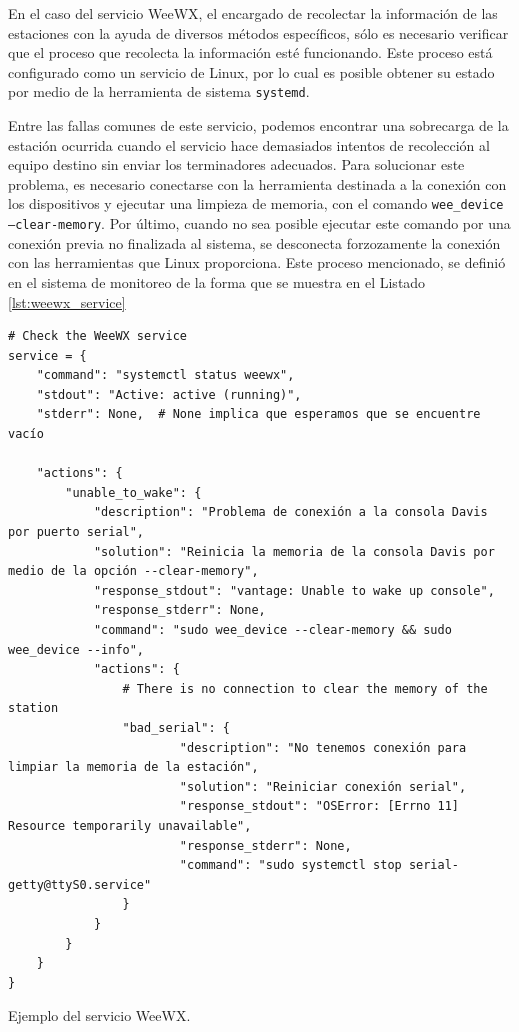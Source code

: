En el caso del servicio WeeWX, el encargado de recolectar la información de las estaciones con la ayuda de diversos métodos específicos, sólo es necesario verificar que el proceso que recolecta la información esté funcionando. Este proceso está configurado como un servicio de Linux, por lo cual es posible obtener su estado por medio de la herramienta de sistema \texttt{systemd}.

Entre las fallas comunes de este servicio, podemos encontrar una sobrecarga de la estación ocurrida cuando el servicio hace demasiados intentos de recolección al equipo destino sin enviar los terminadores adecuados. Para solucionar este problema, es necesario conectarse con la herramienta destinada a la conexión con los dispositivos y ejecutar una limpieza de memoria, con el comando \texttt{wee\_device --clear-memory}. Por último, cuando no sea posible ejecutar este comando por una conexión previa no finalizada al sistema, se desconecta forzozamente la conexión con las herramientas que Linux proporciona. Este proceso mencionado, se definió en el sistema de monitoreo de la forma que se muestra en el Listado \ref{lst:weewx_service}

\begin{listing}
\begin{verbatim}
# Check the WeeWX service
service = {
    "command": "systemctl status weewx",
    "stdout": "Active: active (running)",
    "stderr": None,  # None implica que esperamos que se encuentre vacío

    "actions": {
        "unable_to_wake": {
            "description": "Problema de conexión a la consola Davis por puerto serial",
            "solution": "Reinicia la memoria de la consola Davis por medio de la opción --clear-memory",
            "response_stdout": "vantage: Unable to wake up console",
            "response_stderr": None,
            "command": "sudo wee_device --clear-memory && sudo wee_device --info",
            "actions": {
                # There is no connection to clear the memory of the station
                "bad_serial": {
                        "description": "No tenemos conexión para limpiar la memoria de la estación",
                        "solution": "Reiniciar conexión serial",
                        "response_stdout": "OSError: [Errno 11] Resource temporarily unavailable",
                        "response_stderr": None,
                        "command": "sudo systemctl stop serial-getty@ttyS0.service"
                }
            }
        }
    }
}
\end{verbatim}
\caption{Ejemplo del servicio WeeWX.}
\label{lst:weewx_service}
\end{listing}


